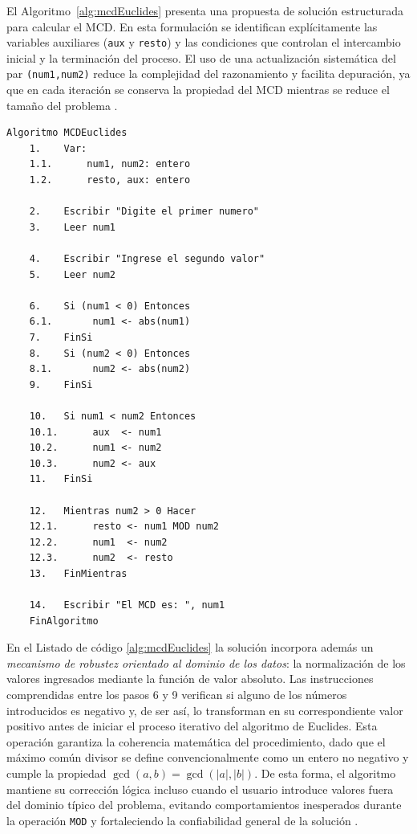 \documentclass[12pt,twoside]{book}
\begin{document}
						\noindent
						El Algoritmo~\ref{alg:mcdEuclides} presenta una propuesta de solución estructurada para calcular el MCD. En esta formulación se identifican explícitamente las variables auxiliares (\texttt{aux} y \texttt{resto}) y las condiciones que controlan el intercambio inicial y la terminación del proceso. El uso de una actualización sistemática del par \texttt{(num1,num2)} reduce la complejidad del razonamiento y facilita depuración, ya que en cada iteración se conserva la propiedad del MCD mientras se reduce el tamaño del problema \cite{Cormen2022Introduction,Qian2018Students}.
						
						\begin{lstlisting}[style=upsamStyle,caption={Cálculo del MCD mediante el algoritmo de Euclides},label={alg:mcdEuclides}]
	Algoritmo MCDEuclides
	1.    Var:
	1.1.      num1, num2: entero
	1.2.      resto, aux: entero
	
	2.    Escribir "Digite el primer numero"
	3.    Leer num1
	
	4.    Escribir "Ingrese el segundo valor"
	5.    Leer num2
	
	6.    Si (num1 < 0) Entonces
	6.1.       num1 <- abs(num1)
	7.    FinSi
	8.    Si (num2 < 0) Entonces
	8.1.       num2 <- abs(num2)
	9.    FinSi
	
	10.   Si num1 < num2 Entonces
	10.1.      aux  <- num1
	10.2.      num1 <- num2
	10.3.      num2 <- aux
	11.   FinSi
	
	12.   Mientras num2 > 0 Hacer
	12.1.      resto <- num1 MOD num2
	12.2.      num1  <- num2
	12.3.      num2  <- resto
	13.   FinMientras
	
	14.   Escribir "El MCD es: ", num1
	FinAlgoritmo \end{lstlisting}
						
						\noindent
						En el Listado de código \ref{alg:mcdEuclides} la solución incorpora además un \emph{mecanismo de robustez orientado al dominio de los datos}: la normalización de los valores ingresados mediante la función de valor absoluto. Las instrucciones comprendidas entre los pasos 6 y 9 verifican si alguno de los números introducidos es negativo y, de ser así, lo transforman en su correspondiente valor positivo antes de iniciar el proceso iterativo del algoritmo de Euclides. Esta operación garantiza la coherencia matemática del procedimiento, dado que el máximo común divisor se define convencionalmente como un entero no negativo y cumple la propiedad $\gcd(a,b)=\gcd(|a|,|b|)$. De esta forma, el algoritmo mantiene su corrección lógica incluso cuando el usuario introduce valores fuera del dominio típico del problema, evitando comportamientos inesperados durante la operación \texttt{MOD} y fortaleciendo la confiabilidad general de la solución \cite{Baladi2005Euclidean,Sorenson1994Two,Sommerville2015Software, Pressman2019Software}.
\end{document}
